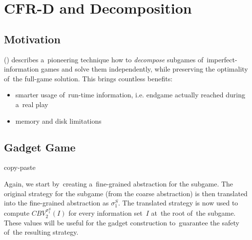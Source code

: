 \chapter{CFR-D and Decomposition}
\label{ch:cfr-d}

\section{Motivation}
(\cite{BurchJohansonBowling13}) describes a~pioneering technique how to \emph{decompose} subgames of~imperfect-information games and solve them independently, while preserving the optimality of~the full-game solution.
This brings countless benefits:
\begin{itemize}
  \item smarter usage of~run-time information, i.e. endgame actually reached during a~real play
  \item memory and disk limitations
\end{itemize}

\section{Gadget Game}
\todo copy-paste

Again, we start by~creating a~fine-grained abstraction for the subgame.
The original strategy for the subgame (from the coarse abstraction) is then translated into the fine-grained abstraction as $\sigma_1^S$.
The translated strategy is now used to compute $CBV_2 ^{\sigma_1^S} (I)$ for every information set~$I$ at~the root of~the subgame.
These values will be useful for the gadget construction to~guarantee the safety of~the resulting strategy.

